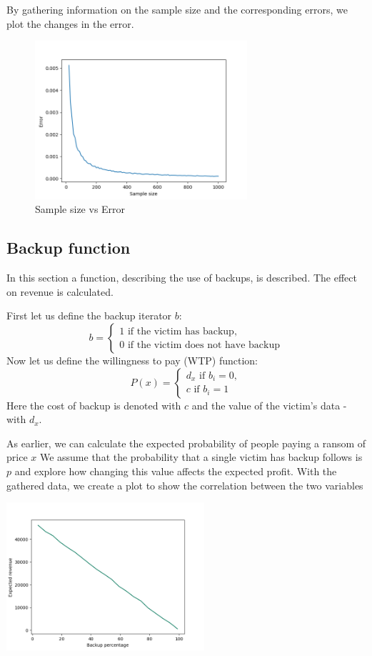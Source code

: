 \documentclass[11pt, a4paper]{article}
\theoremstyle{definition}
\begin{document}
			By gathering information on the sample size and the corresponding errors, we plot the changes in the error.
			\begin{figure}[H]
			\begin{minipage}{1.0\textwidth}
				\centering
				\includegraphics[width=0.7\textwidth]{"Error vs sample size 4"}
				\caption{Sample size vs Error}\label{Fig:Data5}
			\end{minipage}
			\end{figure}
		\subsection{Backup function}
			In this section a function, describing the use of backups, is described. The effect on revenue is calculated.\par
			First let us define the backup iterator $b$: 
			$$
			b=
			\begin{cases}
				1 \text{ if the victim has backup},\\
				0 \text{ if the victim does not have backup}
			\end{cases}
			$$
			Now let us define the willingness to pay (WTP) function:
			$$
			P(x)=
			\begin{cases}
			d_{x} \text{ if } b_{i}=0,\\
			c \text{ if } b_{i}=1
			\end{cases}
			$$
			Here the cost of backup is denoted with $c$ and the value of the victim's data - with $d_{x}$.\par
			As earlier, we can calculate the expected probability of people paying a ransom of price $x$
			We assume that the probability that a single victim has backup follows is $p$ and explore how changing this value affects the expected profit. With the gathered data, we create a plot to show the correlation between the two variables
			\begin{center}
				\includegraphics[width=0.55\textwidth]{Revenue_vs_backup}
			\end{center}
\end{document}
